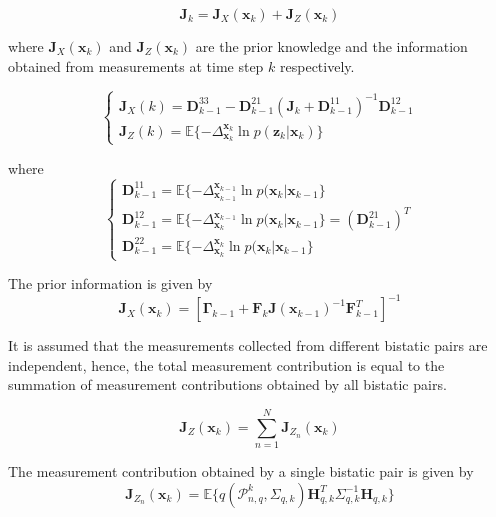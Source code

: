 \documentclass[12pt,journal,draftclsnofoot,onecolumn]{IEEEtran}
\begin{document}
\begin{equation}
	\mathbf{J}_k=\mathbf{J}_X(\mathbf{x}_k)+\mathbf{J}_Z(\mathbf{x}_k)
	\label{J}
\end{equation}

where $\mathbf{J}_X(\mathbf{x}_k)$ and $\mathbf{J}_Z(\mathbf{x}_k)$ are the prior knowledge and the information obtained from measurements at time step $k$ respectively.

\begin{equation}
	\begin{cases}
		\mathbf{J}_{X}(k)=\mathbf{D}_{k-1}^{33}-\mathbf{D}_{k-1}^{21}(\mathbf{J}_k+\mathbf{D}_{k-1}^{11})^{-1}\mathbf{D}_{k-1}^{12}\\
		\mathbf{J}_Z(k) =\mathbb{E}\{-\Delta _{\mathbf{x}_{k}}^{\mathbf{x}_{k}}\ln p(\mathbf{z}_k|\mathbf{x}_{k})\}
	\end{cases}    
\end{equation}

where
\begin{equation}
	\begin{cases}
		\mathbf{D}_{k-1}^{11}=\mathbb{E}\{-\Delta _{\mathbf{x}_{k-1}}^{\mathbf{x}_{k-1}}\ln p(\mathbf{x}_k|\mathbf{x}_{k-1}\}\\
		\mathbf{D}_{k-1}^{12}=\mathbb{E}\{-\Delta _{\mathbf{x}_{k}}^{\mathbf{x}_{k-1}}\ln p(\mathbf{x}_k|\mathbf{x}_{k-1}\}=(\mathbf{D}_{k-1}^{21})^T\\
		\mathbf{D}_{k-1}^{22}=\mathbb{E}\{-\Delta _{\mathbf{x}_{k}}^{\mathbf{x}_{k}}\ln p(\mathbf{x}_k|\mathbf{x}_{k-1}\}
	\end{cases}   
\end{equation}   

The prior information is given by
\begin{equation}
    \mathbf{J}_X(\mathbf{x}_k)=[\mathbf{\Gamma}_{k-1}+\mathbf{F}_k\mathbf{J}(\mathbf{x}_{k-1})^{-1}\mathbf{F}_{k-1}^T]^{-1}
\end{equation}

It is assumed that the measurements collected from different bistatic pairs are independent, hence, the total measurement contribution is equal to the summation of measurement contributions obtained by all bistatic pairs.

\begin{equation}
    \mathbf{J}_Z(\mathbf{x}_k)=\sum_{n=1}^N\mathbf{J}_{Z_{n}}(\mathbf{x}_k)
\end{equation}

The measurement contribution obtained by a single bistatic pair is given by
\begin{equation}
    \mathbf{J}_{Z_{n}}(\mathbf{x}_k)=\mathbb{E}\{q(\mathcal{P}_{n,q}^k,\Sigma_{q,k})\mathbf{H}_{q,k}^T\Sigma_{q,k}^{-1}\mathbf{H}_{q,k}\}
    \label{Jz}
\end{equation}
\end{document}
